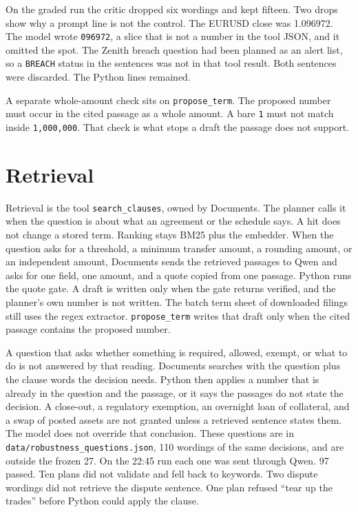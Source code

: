 \documentclass[11pt,a4paper]{article}
\begin{document}
On the graded run the critic dropped six wordings and kept fifteen. Two drops show why a prompt line is not the control. The EURUSD close was 1.096972. The model wrote \texttt{096972}, a slice that is not a number in the tool JSON, and it omitted the spot. The Zenith breach question had been planned as an alert list, so a \texttt{BREACH} status in the sentences was not in that tool result. Both sentences were discarded. The Python lines remained.

A separate whole-amount check sits on \texttt{propose\_term}. The proposed number must occur in the cited passage as a whole amount. A bare \texttt{1} must not match inside \texttt{1,000,000}. That check is what stops a draft the passage does not support.

\section{Retrieval}

Retrieval is the tool \texttt{search\_clauses}, owned by Documents. The planner calls it when the question is about what an agreement or the schedule says. A hit does not change a stored term. Ranking stays BM25 plus the embedder. When the question asks for a threshold, a minimum transfer amount, a rounding amount, or an independent amount, Documents sends the retrieved passages to Qwen and asks for one field, one amount, and a quote copied from one passage. Python runs the quote gate. A draft is written only when the gate returns verified, and the planner's own number is not written. The batch term sheet of downloaded filings still uses the regex extractor. \texttt{propose\_term} writes that draft only when the cited passage contains the proposed number.

A question that asks whether something is required, allowed, exempt, or what to do is not answered by that reading. Documents searches with the question plus the clause words the decision needs. Python then applies a number that is already in the question and the passage, or it says the passages do not state the decision. A close-out, a regulatory exemption, an overnight loan of collateral, and a swap of posted assets are not granted unless a retrieved sentence states them. The model does not override that conclusion. These questions are in \texttt{data/robustness\_questions.json}, 110 wordings of the same decisions, and are outside the frozen 27. On the 22:45 run each one was sent through Qwen. 97 passed. Ten plans did not validate and fell back to keywords. Two dispute wordings did not retrieve the dispute sentence. One plan refused ``tear up the trades'' before Python could apply the clause.
\end{document}
